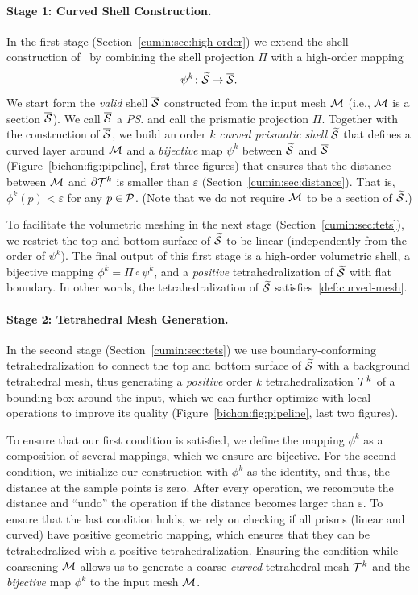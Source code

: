 \paragraph{Stage 1: Curved Shell Construction.}
In the first stage (Section~\ref{cumin:sec:high-order}) we extend the shell construction of~\cite{jiang2020bijective} by combining the shell projection $\Pi$ with {a} high-order mapping 
\[
\psi^k \colon \prS \to \PS.
\]
We start form the \emph{valid} shell $\PS$ constructed from the input mesh $\M$ (i.e., $\M$ is a section $\PS$). We call $\PS$ a \emph{\ps{}} and call the prismatic projection $\Pi$. Together with the construction of $\PS$, we build an order $k$ \emph{curved prismatic shell} $\prS$ that defines a curved layer around $\M$ and a \emph{bijective} map $\psi^k$ between $\prS$ and $\PS$ (Figure~\ref{bichon:fig:pipeline}, first three figures) that ensures that the distance between $\M$ and $\partial\T^k$ is smaller than $\varepsilon$ (Section~\ref{cumin:sec:distance}). That is, $\phi^k(p) < \varepsilon$ for any $p\in\P$. (Note that we do not require $\M$ to be a section of $\prS$.)

To facilitate the volumetric meshing in the next stage (Section~\ref{cumin:sec:tets}), we restrict the top and bottom surface of $\prS$ to be linear (independently from the order of $\psi^k$). The final output of this first stage is a high-order volumetric shell,
a bijective mapping $\phi^k = \Pi \circ \psi^k$,
and a \emph{positive} tetrahedralization of $\prS$ with flat boundary. In other words, the tetrahedralization of $\prS$ satisfies~\ref{def:curved-mesh}.

\paragraph{Stage 2: Tetrahedral Mesh Generation.}
In the second stage (Section~\ref{cumin:sec:tets}) we use boundary-conforming tetrahedralization to connect the top and bottom surface of $\prS$ with a background tetrahedral mesh, thus generating a \emph{positive} order $k$ tetrahedralization $\T^k$ of a bounding box around the input, which we can further optimize with local operations to improve its quality  (Figure~\ref{bichon:fig:pipeline}, last two figures). %


To ensure that our first condition is satisfied{,} we define the mapping $\phi^k$ as a composition of several mappings{,} which we ensure are bijective. 
For the second condition, we initialize our construction with $\phi^k$ {as} the identity, {and} thus, the distance at the sample points is zero. 
After every operation, we recompute the distance and ``undo'' the operation if the distance becomes larger than $\varepsilon$. To ensure that the last condition holds, we rely on checking if all prisms (linear and curved) have positive geometric mapping, which {ensures} that they can be tetrahedralized with a positive tetrahedralization. 
Ensuring the condition while coarsening $\M$ {allows} us to generate a coarse \emph{curved} tetrahedral mesh $\T^k$ and the \emph{bijective} map $\phi^k$ to the input mesh $\M$.


